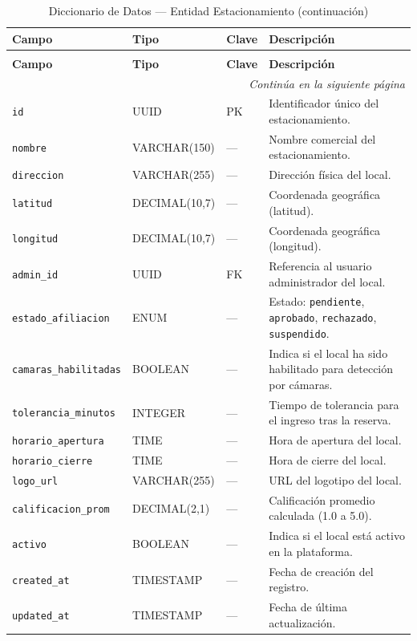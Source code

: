 \begin{longtable}{p{3.5cm} p{2.5cm} p{1.5cm} p{6.5cm}}
\caption{Diccionario de Datos --- Entidad Estacionamiento} \\
\toprule
\textbf{Campo} & \textbf{Tipo} & \textbf{Clave} & \textbf{Descripción} \\
\midrule
\endfirsthead

\caption[]{Diccionario de Datos --- Entidad Estacionamiento (continuación)} \\
\toprule
\textbf{Campo} & \textbf{Tipo} & \textbf{Clave} & \textbf{Descripción} \\
\midrule
\endhead

\midrule
\multicolumn{4}{r}{\footnotesize\textit{Continúa en la siguiente página}} \\
\endfoot

\bottomrule
\endlastfoot

\texttt{id} & UUID & PK & Identificador único del estacionamiento. \\
\texttt{nombre} & VARCHAR(150) & --- & Nombre comercial del estacionamiento. \\
\texttt{direccion} & VARCHAR(255) & --- & Dirección física del local. \\
\texttt{latitud} & DECIMAL(10,7) & --- & Coordenada geográfica (latitud). \\
\texttt{longitud} & DECIMAL(10,7) & --- & Coordenada geográfica (longitud). \\
\texttt{admin\_id} & UUID & FK & Referencia al usuario administrador del local. \\
\texttt{estado\_afiliacion} & ENUM & --- & Estado: \texttt{pendiente}, \texttt{aprobado}, \texttt{rechazado}, \texttt{suspendido}. \\
\texttt{camaras\_habilitadas} & BOOLEAN & --- & Indica si el local ha sido habilitado para detección por cámaras. \\
\texttt{tolerancia\_minutos} & INTEGER & --- & Tiempo de tolerancia para el ingreso tras la reserva. \\
\texttt{horario\_apertura} & TIME & --- & Hora de apertura del local. \\
\texttt{horario\_cierre} & TIME & --- & Hora de cierre del local. \\
\texttt{logo\_url} & VARCHAR(255) & --- & URL del logotipo del local. \\
\texttt{calificacion\_prom} & DECIMAL(2,1) & --- & Calificación promedio calculada (1.0 a 5.0). \\
\texttt{activo} & BOOLEAN & --- & Indica si el local está activo en la plataforma. \\
\texttt{created\_at} & TIMESTAMP & --- & Fecha de creación del registro. \\
\texttt{updated\_at} & TIMESTAMP & --- & Fecha de última actualización. \\
\end{longtable}

